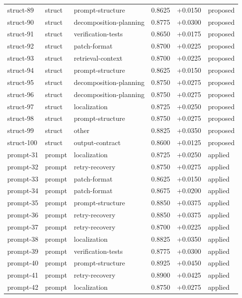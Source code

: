 \begin{center}
\begin{longtable}{llp{5.2cm}rrl}
struct-89 & struct & prompt-structure & 0.8625 & +0.0150 & proposed \\
struct-90 & struct & decomposition-planning & 0.8775 & +0.0300 & proposed \\
struct-91 & struct & verification-tests & 0.8650 & +0.0175 & proposed \\
struct-92 & struct & patch-format & 0.8700 & +0.0225 & proposed \\
struct-93 & struct & retrieval-context & 0.8700 & +0.0225 & proposed \\
struct-94 & struct & prompt-structure & 0.8625 & +0.0150 & proposed \\
struct-95 & struct & decomposition-planning & 0.8750 & +0.0275 & proposed \\
struct-96 & struct & decomposition-planning & 0.8750 & +0.0275 & proposed \\
struct-97 & struct & localization & 0.8725 & +0.0250 & proposed \\
struct-98 & struct & prompt-structure & 0.8750 & +0.0275 & proposed \\
struct-99 & struct & other & 0.8825 & +0.0350 & proposed \\
struct-100 & struct & output-contract & 0.8600 & +0.0125 & proposed \\
prompt-31 & prompt & localization & 0.8725 & +0.0250 & applied \\
prompt-32 & prompt & retry-recovery & 0.8750 & +0.0275 & applied \\
prompt-33 & prompt & patch-format & 0.8625 & +0.0150 & applied \\
prompt-34 & prompt & patch-format & 0.8675 & +0.0200 & applied \\
prompt-35 & prompt & prompt-structure & 0.8850 & +0.0375 & applied \\
prompt-36 & prompt & retry-recovery & 0.8850 & +0.0375 & applied \\
prompt-37 & prompt & retry-recovery & 0.8700 & +0.0225 & applied \\
prompt-38 & prompt & localization & 0.8825 & +0.0350 & applied \\
prompt-39 & prompt & verification-tests & 0.8775 & +0.0300 & applied \\
prompt-40 & prompt & prompt-structure & 0.8925 & +0.0450 & applied \\
prompt-41 & prompt & retry-recovery & 0.8900 & +0.0425 & applied \\
prompt-42 & prompt & localization & 0.8750 & +0.0275 & applied \\

\end{longtable}
\end{center}
